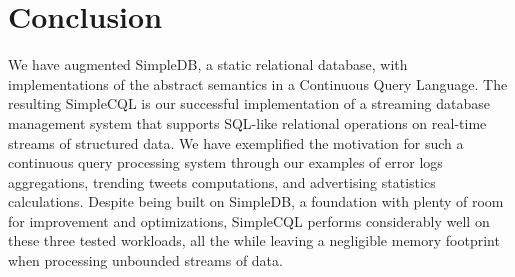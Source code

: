 \documentclass[a4paper, 10pt, conference]{IEEEconf}
\begin{document}
\section{Conclusion}
We have augmented SimpleDB, a static relational database, with implementations of the abstract semantics in a Continuous Query Language. The resulting SimpleCQL is our successful implementation of a streaming database management system that supports SQL-like relational operations on real-time streams of structured data. We have exemplified the motivation for such a continuous query processing system through our examples of error logs aggregations, trending tweets computations, and advertising statistics calculations. Despite being built on SimpleDB, a foundation with plenty of room for improvement and optimizations, SimpleCQL performs considerably well on these three tested workloads, all the while leaving a negligible memory footprint when processing unbounded streams of data.



\end{document}
